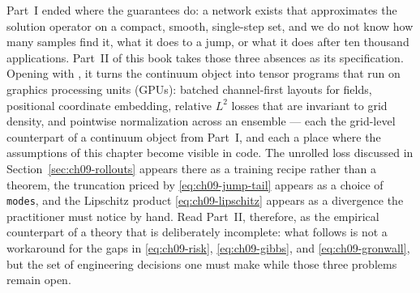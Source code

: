 
Part~I ended where the guarantees do: a network exists that approximates the
solution operator on a compact, smooth, single-step set, and we do not know how
many samples find it, what it does to a jump, or what it does after ten thousand
applications. Part~II of this book takes those three absences as its
specification. Opening with ,
it turns the
continuum object into tensor programs that run on graphics processing units
(GPUs): batched channel-first layouts for fields, positional coordinate
embedding, relative $L^2$ losses that are invariant to grid density, and
pointwise normalization across an ensemble --- each the grid-level counterpart
of a continuum object from Part~I, and each a place where the
assumptions of this chapter become visible in code. The unrolled loss discussed
in Section~\ref{sec:ch09-rollouts} appears there as a training recipe rather than
a theorem, the truncation priced by \eqref{eq:ch09-jump-tail} appears as a choice
of \texttt{modes}, and the Lipschitz product \eqref{eq:ch09-lipschitz} appears as
a divergence the practitioner must notice by hand. Read Part~II, therefore, as
the empirical counterpart of a theory that is deliberately incomplete: what
follows is not a workaround for the gaps in \eqref{eq:ch09-risk},
\eqref{eq:ch09-gibbs}, and \eqref{eq:ch09-gronwall}, but the set of engineering
decisions one must make while those three problems remain open.

\vspace{1.5em}
